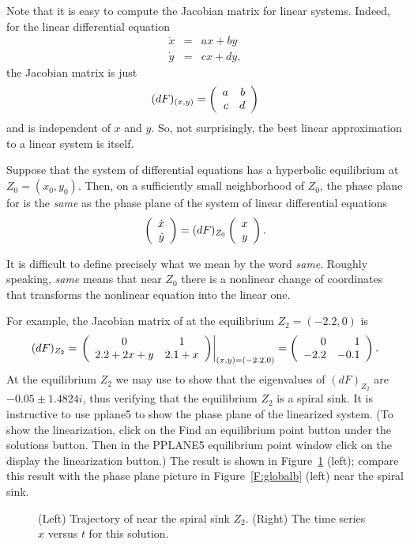 \documentclass{ximera}
\begin{document}
Note that it is easy to compute the Jacobian matrix for linear 
systems.  Indeed, for the linear differential equation
\begin{eqnarray*}
\dot{x} & = & ax+by \\ \dot{y} & = & cx+dy,
\end{eqnarray*}
the Jacobian matrix is just 
\[
(dF)_{(x,y)} = \left(\begin{array}{rr} a & b\\ c &d\end{array}\right)
\]
and is independent of $x$ and $y$.  So, not surprisingly, the 
best linear approximation to a linear system is itself.

\begin{theorem} \label{T:linearization} 
Suppose that the system of differential equations
 has a hyperbolic equilibrium at
$Z_0=(x_0,y_0)$.  Then, on a sufficiently small neighborhood of
$Z_0$, the phase plane for  is the {\em
same\/} as the phase plane of the system of 
linear differential equations
\begin{equation}  \label{e:linearizedeqn}
\left(\begin{array}{r} \dot{x} \\ \dot{y}\end{array}\right) = (dF)_{Z_0} \left(\begin{array}{r} x \\ y\end{array}\right).
\end{equation}
\end{theorem}  
It is difficult to define precisely what we mean by the word
{\em same\/}. Roughly speaking, {\em same\/} means that near 
$Z_0$ there is a nonlinear change of coordinates that 
transforms the nonlinear equation into the linear one.

For example, the Jacobian matrix of  at the
equilibrium $Z_2=(-2.2,0)$ is 
\[
(dF)_{Z_2} = \left.\left(\begin{array}{cc} 0 & 1\\ 2.2+2x+y &2.1+x\end{array}\right)\right|_{(x,y)=(-2.2,0)} 
= \left(\begin{array}{rr} 0 & 1\\ -2.2 &-0.1\end{array}\right).
\]
At the equilibrium $Z_2$ we may use \Matlab to show that the 
eigenvalues of $(dF)_{Z_2}$ are $-0.05\pm 1.4824i$, thus verifying 
that the equilibrium $Z_2$ is a spiral sink.  
It is instructive to use {\sf pplane5} to 
show the phase plane of 
the linearized system.  
(To show the linearization, click on the 
{\sf Find an equilibrium point} button under the {\sf solutions} 
button.  Then in the {\sf PPLANE5 equilibrium point} window click 
on the {\sf display the linearization} button.)  The result is
shown in Figure~\ref{F:spiral} (left); compare this result 
with the phase plane picture in Figure~\ref{F:globalb} (left) 
near the spiral sink.

\begin{figure}[htb]
           \centerline{%
           }
           \caption{(Left) Trajectory of \protect{} 
	     near the spiral sink $Z_2$. (Right) The time series $x$ 
		versus $t$ for this solution.}
           \label{F:spiral}
\end{figure}
\end{document}
